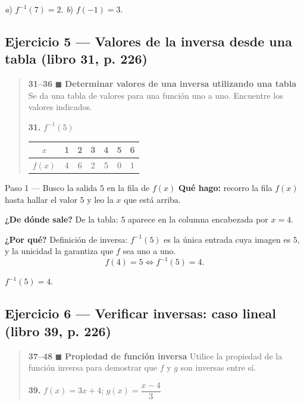 \documentclass[11pt]{article}
\begin{document}
\begin{resp}
\textit{a}) $f^{-1}(7)=2$. \qquad \textit{b}) $f(-1)=3$.
\end{resp}

\subsection*{Ejercicio 5 --- Valores de la inversa desde una tabla (libro 31, p. 226)}

\begin{quote}
\textbf{31--36} $\blacksquare$ \textbf{Determinar valores de una inversa utilizando una tabla} Se da una tabla de valores para una función uno a uno. Encuentre los valores indicados.

\textbf{31.} $f^{-1}(5)$

\begin{center}
\begin{tabular}{|c|c|c|c|c|c|c|}
\hline
$x$ & 1 & 2 & 3 & 4 & 5 & 6 \\ \hline
$f(x)$ & 4 & 6 & 2 & 5 & 0 & 1 \\ \hline
\end{tabular}
\end{center}
\end{quote}

\begin{paso}{Paso 1 --- Busco la salida $5$ en la fila de $f(x)$}
\textbf{Qué hago:} recorro la fila $f(x)$ hasta hallar el valor $5$ y leo la $x$ que está arriba.

\textbf{¿De dónde sale?} De la tabla: $5$ aparece en la columna encabezada por $x=4$.

\textbf{¿Por qué?} Definición de inversa: $f^{-1}(5)$ es la única entrada cuya imagen es $5$, y la unicidad la garantiza que $f$ sea uno a uno.
\[
f(4)=5 \iff f^{-1}(5)=4.
\]
\end{paso}

\begin{resp}
$f^{-1}(5)=4$.
\end{resp}

\subsection*{Ejercicio 6 --- Verificar inversas: caso lineal (libro 39, p. 226)}

\begin{quote}
\textbf{37--48} $\blacksquare$ \textbf{Propiedad de función inversa} Utilice la propiedad de la función inversa para demostrar que $f$ y $g$ son inversas entre sí.

\textbf{39.} $f(x)=3x+4$; \quad $g(x)=\dfrac{x-4}{3}$
\end{quote}
\end{document}
